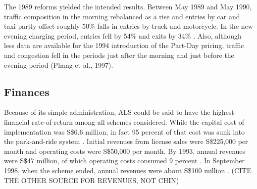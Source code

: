The 1989 reforms yielded the intended results. Between May 1989 and May 1990, traffic composition in the morning rebalanced as a rise and entries by car and taxi partly offset roughly 50\% falls in entries by truck and motorcycle. In the new evening charging period, entries fell by 54\% and exits by 34\% \citep[p. 19]{Gomez-Ibanez1994}. Also, although less data are available for the 1994 introduction of the Part-Day pricing, traffic and congestion fell in the periods just after the morning and just before the evening period (Phang et al., 1997).

\subsection{Finances}

Because of its simple administration, ALS could be said to have the highest financial rate-of-return among all schemes considered. While the capital cost of implementation was S\$6.6 million, in fact 95 percent of that cost was sunk into the park-and-ride system \citet[p. 38]{WatsonHolland1978}. Initial revenues from license sales were S\$225,000 per month and operating costs were S\$50,000 per month. By 1993, annual revenues were S\$47 million, of which operating costs consumed 9 percent \citep{PhangToh2004}. In September 1998, when the scheme ended, annual revenues were about S\$100 million \citep{Chin2010}. (CITE THE OTHER SOURCE FOR REVENUES, NOT CHIN)